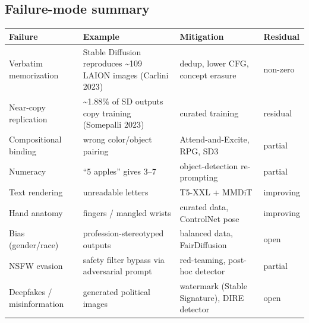 \subsection{Failure-mode summary}\label{failure-mode-summary}

{\def\LTcaptype{none} %
\begin{longtable}[]{@{}
  >{\raggedright\arraybackslash}p{}
  >{\raggedright\arraybackslash}p{}
  >{\raggedright\arraybackslash}p{}
  >{\raggedright\arraybackslash}p{}@{}}
\toprule\noalign{}
\begin{minipage}[b]{\linewidth}\raggedright
Failure
\end{minipage} & \begin{minipage}[b]{\linewidth}\raggedright
Example
\end{minipage} & \begin{minipage}[b]{\linewidth}\raggedright
Mitigation
\end{minipage} & \begin{minipage}[b]{\linewidth}\raggedright
Residual
\end{minipage} \\
\midrule\noalign{}
\endhead
\bottomrule\noalign{}
\endlastfoot
Verbatim memorization & Stable Diffusion reproduces \textasciitilde109 LAION images (Carlini 2023) & dedup, lower CFG, concept erasure & non-zero \\
Near-copy replication & \textasciitilde1.88\% of SD outputs copy training (Somepalli 2023) & curated training & residual \\
Compositional binding & wrong color/object pairing & Attend-and-Excite, RPG, SD3 & partial \\
Numeracy & ``5 apples'' gives 3--7 & object-detection re-prompting & partial \\
Text rendering & unreadable letters & T5-XXL + MMDiT & improving \\
Hand anatomy & 6 fingers / mangled wrists & curated data, ControlNet pose & improving \\
Bias (gender/race) & profession-stereotyped outputs & balanced data, FairDiffusion & open \\
NSFW evasion & safety filter bypass via adversarial prompt & red-teaming, post-hoc detector & partial \\
Deepfakes / misinformation & generated political images & watermark (Stable Signature), DIRE detector & open \\

\end{longtable}}
